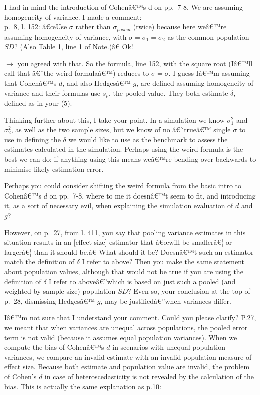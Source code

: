 \begin{appendix}
\color{brown} I had in mind the introduction of Cohenâ€™s d on pp.~7-8.
We are assuming homogeneity of variance. I made a comment:\\
p.~8, l. 152: â€œUse \(\sigma\) rather than \(\sigma_{pooled}\) (twice)
because here weâ€™re assuming homogeneity of variance, with
\(\sigma = \sigma_1 =\sigma_2\) as the common population \(SD\)? (Also
Table 1, line 1 of Note.)â€ Ok!

\(\rightarrow\) you agreed with that. So the formula, line 152, with the
square root (Iâ€™ll call that â€˜the weird formulaâ€™) reduces to
\(\sigma = \sigma\). I guess Iâ€™m assuming that Cohenâ€™s \(d\), and
also Hedgesâ€™ \(g\), are defined assuming homogeneity of variance and
their formulas use \(s_p\), the pooled value. They both estimate
\(\delta\), defined as in your (5).

Thinking further about this, I take your point. In a simulation we know
\(\sigma_1^2\) and \(\sigma_2^2\), as well as the two sample sizes, but
we know of no â€˜trueâ€™ single \(\sigma\) to use in defining the
\(\delta\) we would like to use as the benchmark to assess the estimates
calculated in the simulation. Perhaps using the weird formula is the
best we can do; if anything using this means weâ€™re bending over
backwards to minimise likely estimation error.

Perhaps you could consider shifting the weird formula from the basic
intro to Cohenâ€™s \(d\) on pp.~7-8, where to me it doesnâ€™t seem to
fit, and introducing it, as a sort of necessary evil, when explaining
the simulation evaluation of \(d\) and \(g\)?

\color{black} However, on p.~27, from l. 411, you say that pooling
variance estimates in this situation results in an {[}effect size{]}
estimator that â€œwill be smallerâ€¦ or largerâ€¦ than it should be.â€
What should it be? Doesnâ€™t such an estimator match the definition of
\(\delta\) I refer to above? Then you make the same statement about
population values, although that would not be true if you are using the
definition of \(\delta\) I refer to aboveâ€''which is based on just such
a pooled (and weighted by sample size) population \(SD\)? Even so, your
conclusion at the top of p.~28, dismissing Hedgesâ€™ \(g\), may be
justifiedâ€''when variances differ.

\color{blue} Iâ€™m not sure that I understand your comment. Could you
please clarify? P.27, we meant that when variances are unequal across
populations, the pooled error term is not valid (because it assumes
equal population variances). When we compute the bias of Cohenâ€™s \(d\)
in scenarios with unequal population variances, we compare an invalid
estimate with an invalid population measure of effect size. Because both
estimate and population value are invalid, the problem of Cohen's \(d\)
in case of heteroscedasticity is not revealed by the calculation of the
bias. This is actually the same explanation as p.10:


\end{appendix}
